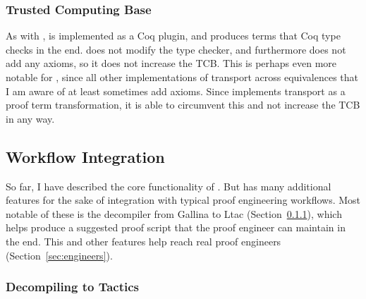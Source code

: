 \subsubsection{Trusted Computing Base}
\label{sec:pi-tcb}

As with \sysname, \toolnamec is implemented as a Coq plugin, and produces terms that Coq type checks in the end.
\toolnamec does not modify the type checker, and furthermore does not add any axioms, so it does not increase the TCB.
This is perhaps even more notable for \toolnamec, since all other implementations of transport across equivalences
that I am aware of at least sometimes add axioms.
Since \toolnamec implements transport as a proof term transformation, it is able to circumvent this and not increase the TCB in any way.

\subsection{Workflow Integration}
\label{sec:pi-workflow}

So far, I have described the core functionality of \toolnamec.
But \toolnamec has many additional features for the sake of integration with typical proof engineering workflows.
Most notable of these is the decompiler from Gallina to Ltac (Section~\ref{sec:decompiler}),
which helps \toolnamec produce a suggested proof script that the proof engineer can maintain in the end.
This and other features help \toolnamec reach real proof engineers (Section~\ref{sec:engineers}).

\subsubsection{Decompiling to Tactics}
\label{sec:decompiler}

